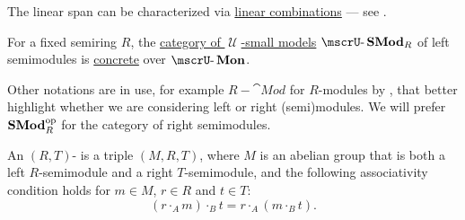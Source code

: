 \begin{definition}
\begin{thmenum}[resume=def:semimodule]
    The linear span can be characterized via \hyperref[rem:linear_combinations]{linear combinations} --- see .

     For a fixed semiring \( R \), the \hyperref[def:category_of_small_first_order_models]{category of \( \mscrU \)-small models} \( \ucat{SMod}_R \) of left semimodules is \hyperref[def:concrete_category]{concrete} over \hyperref[def:monoid]{\( \ucat{Mon} \)}.

    Other notations are in use, for example \( R-\cat{Mod} \) for \( R \)-modules by , that better highlight whether we are considering left or right (semi)modules. We will prefer \( \operatorname{\mathbf{SMod}}_R^{\operatorname{op}} \) for the category of right semimodules.

     An \( (R, T) \)- is a triple \( (M, R, T) \), where \( M \) is an abelian group that is both a left \( R \)-semimodule and a right \( T \)-semimodule, and the following associativity condition holds for \( m \in M \), \( r \in R \) and \( t \in T \):
    \begin{equation}\label{eq:def:semimodule/bisemimodule/associativity}
      (r \cdot_A m) \cdot_B t = r \cdot_A (m \cdot_B t).
    \end{equation}
  \end{thmenum}
\end{definition}
